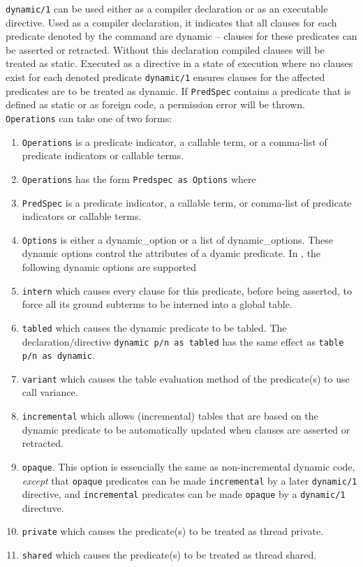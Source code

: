 \begin{description}
\label{dynamic-declaration}
\label{dynamic/1}
%
{\tt dynamic/1} can be used either as a compiler declaration or as an
executable directive.  Used as a compiler declaration, it indicates
that all clauses for each predicate denoted by the command are dynamic
-- clauses for these predicates can be asserted or retracted.  Without
this declaration compiled clauses will be treated as static.  Executed
as a directive in a state of execution where no clauses exist for each
denoted predicate {\tt dynamic/1} ensures clauses for the affected
predicates are to be treated as dynamic. If {\tt PredSpec} contains a
predicate that is defined as static or as foreign code, a permission
error will be thrown.  {\tt Operations} can take one of two forms:
%

\begin{enumerate}
\item {\tt Operations} is a predicate indicator, a callable term, or a
  comma-list of predicate indicators or callable terms.
%
\item {\tt Operations} has the form {\tt Predspec as Options} where
\bi
\item {\tt PredSpec} is a predicate indicator, a callable term, or
  comma-list of predicate indicators or callable terms.
%
\item {\tt Options} is either a dynamic\_option or a list of
  dynamic\_options.  These dynamic options control the attributes of a
  dyamic predicate.  In \version, the following dynamic options are
  supported 
%
\bi
\item{\tt intern} which causes every clause for this predicate, before 
being asserted, to force all its ground subterms to be interned into a 
global table.
%
\item{\tt tabled} which causes the dynamic predicate to be tabled.
  The declaration/directive {\tt dynamic p/n as tabled} has the same
  effect as {\tt table p/n as dynamic}.
%
\item {\tt variant} which causes the table evaluation method of the
  predicate(s) to use call variance.
%
%
\item {\tt incremental} which allows (incremental) tables that are
  based on the dynamic predicate to be automatically updated when
  clauses are asserted or retracted.
%
\item {\tt opaque}. This option is essencially the same as
  non-incremental dynamic code, {\em except} that {\tt opaque}
  predicates can be made {\tt incremental} by a later {\tt dynamic/1}
  directive, and {\tt incremental} predicates can be made {\tt opaque}
  by a {\tt dynamic/1} directuve.
%
\item {\tt private} which causes the predicate(s) to be treated as
  thread private.
%
\item {\tt shared} which causes the predicate(s) to be treated as
  thread shared.
\ei
\ei
\end{enumerate}


\end{description}
